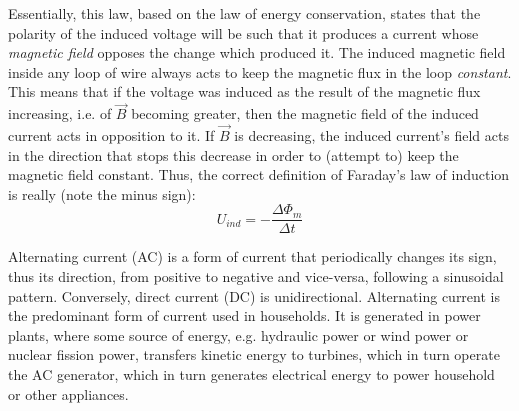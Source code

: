 Essentially, this law, based on the law of energy conservation, states that the polarity of the induced voltage will be such that it produces a current whose \emph{magnetic field} opposes the change which produced it. The induced magnetic field inside any loop of wire always acts to keep the magnetic flux in the loop \emph{constant}. This means that if the voltage was induced as the result of the magnetic flux increasing, i.e. of $\vec{B}$ becoming greater, then the magnetic field of the induced current acts in opposition to it. If $\vec{B}$ is decreasing, the induced current's field acts in the direction that stops this decrease in order to (attempt to) keep the magnetic field constant. Thus, the correct definition of Faraday's law of induction is really (note the minus sign): $$U_{ind} = - \frac{\Delta \Phi_m}{\Delta t}$$


Alternating current (AC) is a form of current that periodically changes its sign, thus its direction, from positive to negative and vice-versa, following a sinusoidal pattern. Conversely, direct current (DC) is unidirectional. Alternating current is the predominant form of current used in households. It is generated in power plants, where some source of energy, e.g. hydraulic power or wind power or nuclear fission power, transfers kinetic energy to turbines, which in turn operate the AC generator, which in turn generates electrical energy to power household or other appliances.


